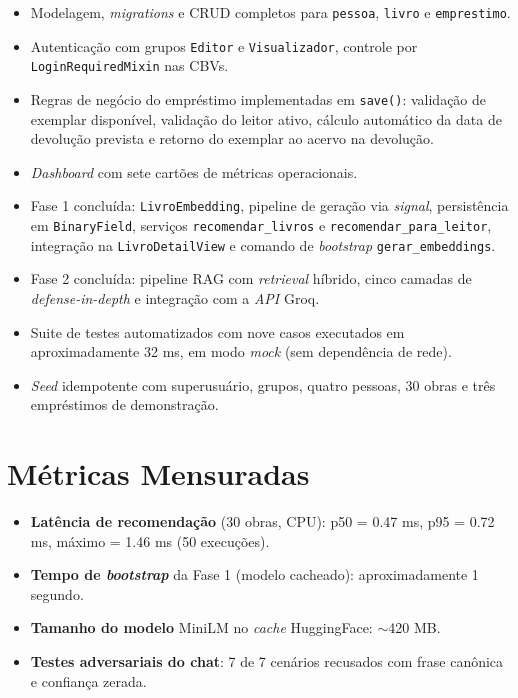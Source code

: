 \documentclass[monografia,abnt]{inf-ufg-modificado}
\begin{document}
\begin{itemize}
    \item Modelagem, \textit{migrations} e CRUD completos para \texttt{pessoa}, \texttt{livro} e \texttt{emprestimo}.
    \item Autenticação com grupos \texttt{Editor} e \texttt{Visualizador}, controle por \texttt{LoginRequiredMixin} nas CBVs.
    \item Regras de negócio do empréstimo implementadas em \texttt{save()}: validação de exemplar disponível, validação do leitor ativo, cálculo automático da data de devolução prevista e retorno do exemplar ao acervo na devolução.
    \item \textit{Dashboard} com sete cartões de métricas operacionais.
    \item Fase 1 concluída: \texttt{LivroEmbedding}, pipeline de geração via \textit{signal}, persistência em \texttt{BinaryField}, serviços \texttt{recomendar\_livros} e \texttt{recomendar\_para\_leitor}, integração na \texttt{LivroDetailView} e comando de \textit{bootstrap} \texttt{gerar\_embeddings}.
    \item Fase 2 concluída: pipeline RAG com \textit{retrieval} híbrido, cinco camadas de \textit{defense-in-depth} e integração com a \textit{API} Groq.
    \item Suite de testes automatizados com nove casos executados em aproximadamente 32 ms, em modo \textit{mock} (sem dependência de rede).
    \item \textit{Seed} idempotente com superusuário, grupos, quatro pessoas, 30 obras e três empréstimos de demonstração.
\end{itemize}

\section{Métricas Mensuradas}

\begin{itemize}
    \item \textbf{Latência de recomendação} (30 obras, CPU): p50 = 0.47 ms, p95 = 0.72 ms, máximo = 1.46 ms (50 execuções).
    \item \textbf{Tempo de \textit{bootstrap}} da Fase 1 (modelo cacheado): aproximadamente 1 segundo.
    \item \textbf{Tamanho do modelo} MiniLM no \textit{cache} HuggingFace: $\sim$420 MB.
    \item \textbf{Testes adversariais do chat}: 7 de 7 cenários recusados com frase canônica e confiança zerada.
\end{itemize}
\end{document}
